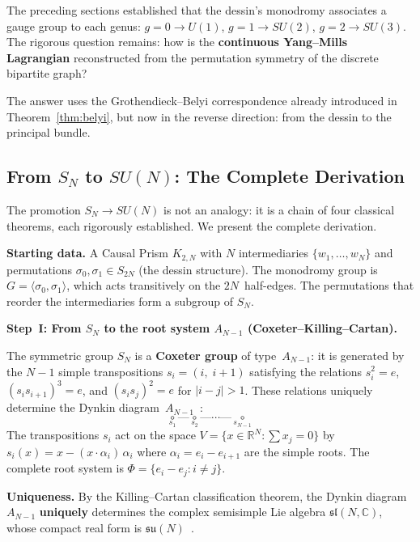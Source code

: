 The preceding sections established that the dessin's monodromy
associates a gauge group to each genus:
$g = 0 \to U(1)$, $g = 1 \to SU(2)$, $g = 2 \to SU(3)$.
The rigorous question remains: how is the \textbf{continuous Yang--Mills
Lagrangian} reconstructed from the permutation symmetry of the discrete
bipartite graph?

The answer uses the Grothendieck--Belyi correspondence already
introduced in Theorem~\ref{thm:belyi}, but now in the
reverse direction: from the dessin to the principal bundle.

\subsection{From $S_N$ to $SU(N)$: The Complete Derivation}

The promotion $S_N \to SU(N)$ is not an analogy: it is a chain
of four classical theorems, each rigorously established.
We present the complete derivation.

\medskip\noindent
\textbf{Starting data.}
A Causal Prism $K_{2,N}$ with $N$ intermediaries
$\{w_1, \ldots, w_N\}$ and permutations
$\sigma_0, \sigma_1 \in S_{2N}$ (the dessin structure). The
monodromy group is $G = \langle \sigma_0, \sigma_1 \rangle$, which
acts transitively on the $2N$~half-edges. The permutations
that reorder the intermediaries form a subgroup of $S_N$.

\medskip\noindent
\textbf{Step~I: From $S_N$ to the root system $A_{N-1}$
(Coxeter--Killing--Cartan).}

The symmetric group $S_N$ is a \textbf{Coxeter group} of
type~$A_{N-1}$: it is generated by the $N - 1$ simple transpositions
$s_i = (i,\; i{+}1)$ satisfying the relations
$s_i^2 = e$, $(s_i s_{i+1})^3 = e$, and $(s_i s_j)^2 = e$ for
$|i - j| > 1$. These relations uniquely determine the Dynkin
diagram~$A_{N-1}$~\cite{humphreys1990}:
\[
  \underset{s_1}{\circ} \text{---}
  \underset{s_2}{\circ} \text{---}
  \cdots \text{---}
  \underset{s_{N-1}}{\circ}
\]
The transpositions $s_i$ act on the space
$V = \{x \in \mathbb{R}^N : \sum x_j = 0\}$ by
$s_i(x) = x - (x \cdot \alpha_i)\,\alpha_i$ where
$\alpha_i = e_i - e_{i+1}$ are the simple roots. The complete
root system is $\Phi = \{e_i - e_j : i \neq j\}$.

\smallskip\noindent
\textbf{Uniqueness.} By the Killing--Cartan classification theorem,
the Dynkin diagram $A_{N-1}$ \textbf{uniquely} determines the
complex semisimple Lie algebra $\mathfrak{sl}(N, \mathbb{C})$, whose
compact real form is $\mathfrak{su}(N)$~\cite{humphreys1972}.

